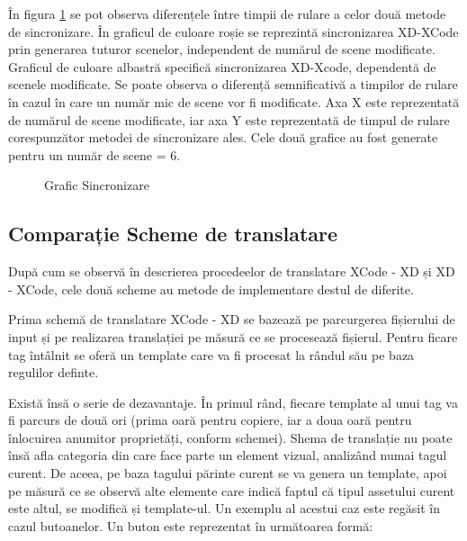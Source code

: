 În figura \ref{fig:GraficSinc2} se pot observa diferențele între timpii de rulare a celor două metode de sincronizare. În graficul de culoare roșie se reprezintă sincronizarea XD-XCode prin generarea tuturor scenelor, independent de numărul de scene modificate. Graficul de culoare albastră specifică sincronizarea XD-Xcode, dependentă de scenele modificate. Se poate observa o diferență semnificativă a timpilor de rulare în cazul în care un număr mic de scene vor fi modificate. Axa X este reprezentată de numărul de scene modificate, iar axa Y este reprezentată de timpul de rulare corespunzător metodei de sincronizare ales. Cele două grafice au fost generate pentru un număr de scene = 6.

\begin{figure}[!htbp]
\centering
{}
\caption{Grafic Sincronizare} \label{fig:GraficSinc2}
\end{figure}

\subsection{Comparație Scheme de translatare}

După cum se observă în descrierea procedeelor de translatare XCode - XD și XD - XCode, cele două scheme au metode de implementare destul de diferite. 

Prima schemă de translatare XCode - XD se bazează pe parcurgerea fișierului de input și pe realizarea translației pe măsură ce se procesează fișierul. Pentru ficare tag întâlnit se oferă un template care va fi procesat la rândul său pe baza regulilor definte. 

Există însă o serie de dezavantaje. În primul rând, fiecare template al unui tag va fi parcurs de două ori (prima oară pentru copiere, iar a doua oară pentru înlocuirea anumitor proprietăți, conform schemei). 
Shema de translație nu poate însă afla categoria din care face parte un element vizual, analizând numai tagul curent. De aceea, pe baza tagului părinte curent se va genera un template, apoi pe măsură ce se observă alte elemente care indică faptul că tipul assetului curent este altul, se modifică și template-ul. Un exemplu al acestui caz este regăsit în cazul butoanelor. Un buton este reprezentat în următoarea formă:

